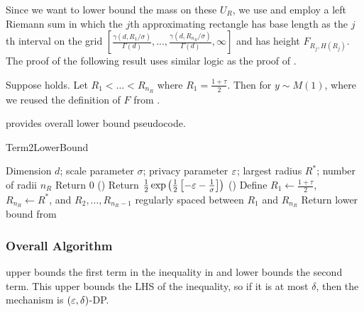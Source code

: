 Since we want to lower bound the mass on these $U_R$, we use  and employ a left Riemann sum in which the $j$th approximating rectangle has base length as the $j$th interval on the grid $\left[\frac{\gamma(d, R_{1}/\sigma)}{\Gamma(d)},...,\frac{\gamma(d, R_{n_{R}}/\sigma)}{\Gamma(d)},\infty\right]$ and has height $F_{R_{j},H(R_{j})}$. The proof of the following result uses similar logic as the proof of .

\begin{lemma}
\label{lem:lower_bound}
    Suppose  holds. Let $R_1 < \ldots < R_{n_R}$ where $R_1 = \frac{1+\tau}{2}$. Then for $y \sim M(1)$,
    where we reused the definition of $F$ from .
\end{lemma}

 provides overall lower bound pseudocode.

\begin{algorithm}
    \caption{Term2LowerBound}
    \label{alg:term_2_lb}
    \begin{algorithmic}[1]
     Dimension $d$; scale parameter $\sigma$; privacy parameter $\varepsilon$; largest radius $R^*$; number of radii $n_R$
        \STATE Return 0 ()
    \ENDIF
        \STATE Return $\frac{1}{2}\exp\left(\frac{1}{2}\left[-\varepsilon - \frac{1}{\sigma}\right]\right)$ ()
    \ENDIF
    \STATE Define $R_1 \gets \frac{1+\tau}{2}$, $R_{n_R} \gets R^*$, and $R_2, \ldots, R_{n_R-1}$ regularly spaced between $R_1$ and $R_{n_R}$
    \STATE Return lower bound from 
    \end{algorithmic}
\end{algorithm}

\subsubsection{Overall Algorithm}
\label{subsec:overall}
 upper bounds the first term in the inequality in  and  lower bounds the second term. This upper bounds the LHS of the inequality, so if it is at most $\delta$, then the mechanism is $(\varepsilon, \delta)$-DP.

